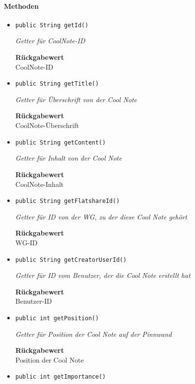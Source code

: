    \paragraph*{Methoden}
    \begin{itemize}
    	\item{\texttt{public String getId()}}
    	
    	\textit{Getter für CoolNote-ID}
    	
    	
    	
    	\textbf{Rückgabewert} \\
    	CoolNote-ID        \item{\texttt{public String getTitle()}}
    	
    	\textit{Getter für Überschrift von der Cool Note}
    	
    	
    	
    	\textbf{Rückgabewert} \\
    	CoolNote-Überschrift        \item{\texttt{public String getContent()}}
    	
    	\textit{Getter für Inhalt von der Cool Note}
    	
    	
    	
    	\textbf{Rückgabewert} \\
    	CoolNote-Inhalt        \item{\texttt{public String getFlatshareId()}}
    	
    	\textit{Getter für ID von der WG, zu der diese Cool Note gehört}
    	
    	
    	
    	\textbf{Rückgabewert} \\
    	WG-ID        \item{\texttt{public String getCreatorUserId()}}
    	
    	\textit{Getter für ID vom Benutzer, der die Cool Note erstellt hat}
    	
    	
    	
    	\textbf{Rückgabewert} \\
    	Benutzer-ID        \item{\texttt{public int getPosition()}}
    	
    	\textit{Getter für Position der Cool Note auf der Pinnwand}
    	
    	
    	
    	\textbf{Rückgabewert} \\
    	Position der Cool Note        \item{\texttt{public int getImportance()}}
    	

\end{itemize}
